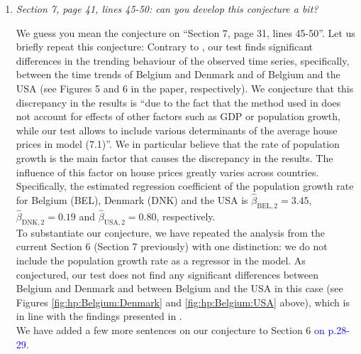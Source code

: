 \documentclass[a4paper,12pt]{article}
\begin{document}
\begin{enumerate}[label=\arabic*.,leftmargin=0.6cm]
\item \textit{Section 7, page 41, lines 45-50: can you develop this conjecture a bit?}

We guess you mean the conjecture on ``Section 7, page 31, lines 45-50''. Let us briefly repeat this conjecture: Contrary to \cite{Knoll2017}, our test finds significant differences in the trending behaviour of the observed time series, specifically, between the time trends of Belgium and Denmark and of Belgium and the USA (see Figures 5 and 6 in the paper, respectively). We conjecture that this discrepancy in the results is ``due to the fact that the method used in \cite{Knoll2017} does not account for effects of other factors such as GDP or population growth, while our test allows to include various determinants of the average house prices in model (7.1)''. We in particular believe that the rate of population growth is the main factor that causes the discrepancy in the results. The influence of this factor on house prices greatly varies across countries. Specifically, the estimated regression coefficient of the population growth rate for Belgium (BEL), Denmark (DNK) and the USA is $\widehat{\beta}_{\text{BEL}, 2} = 3.45$, $\widehat{\beta}_{\text{DNK}, 2} = 0.19$ and $\widehat{\beta}_{\text{USA}, 2} = 0.80$, respectively. \\
To substantiate our conjecture, we have repeated the analysis from the current Section 6 (Section 7 previously) with one distinction: we do not include the population growth rate as a regressor in the model.
As conjectured, our test does not find any significant differences between Belgium and Denmark and between Belgium and the USA in this case (see Figures \ref{fig:hp:Belgium:Denmark} and \ref{fig:hp:Belgium:USA} above), which is in line with the findings presented in \cite{Knoll2017}. \\
We have added a few more sentences on our conjecture to Section 6 \textcolor{blue}{on p.28-29}. 


\end{enumerate}
\end{document}
